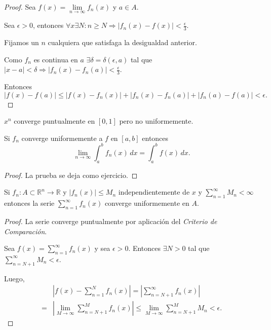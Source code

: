 \begin{proof}
Sea $f(x)=\lim\limits_{n \to \infty} f_n(x)$ y $a \in A$. 

Sea $\epsilon>0$, entonces $\forall x \exists N: n\geq N\Rightarrow|f_n(x)-f(x)|<\frac{\epsilon}{3} $. 

Fijamos un $n$ cualquiera que satisfaga la desigualdad anterior.

Como $f_n$ es continua en $a$ $\exists \delta=\delta(\epsilon,a)$ tal que 
$|x-a|<\delta \Rightarrow |f_n(x)-f_n(a)|<\frac{\epsilon}{3}$. 

Entonces 
\[
|f(x)-f(a)|\leq |f(x)-f_n(x)|+|f_n(x)-f_n(a)|+|f_n(a)-f(a)|<\epsilon.
\]
\end{proof}

\begin{ejemplo}{}
$x^n$ converge puntualmente en $[0,1]$ pero no uniformemente.
\end{ejemplo}

\begin{teorema}{}
Si $f_n$ converge uniformemente a $f$ en $[a,b]$ entonces
\[
\lim\limits_{n \to \infty} \int_a^b f_n(x)\,dx=\int_a^b f(x)\,dx.
\]
\end{teorema}

\begin{proof}
La prueba se deja como ejercicio.
\end{proof}

\begin{teorema}{}
Si $f_n:A\subset \mathbb{R}^n \to \mathbb{R}$ y $|f_n(x)|\leq M_n$ independientemente de $x$
y $\sum\limits_{n=1}^{\infty} M_n<\infty$ entonces la serie $\sum\limits_{n=1}^{\infty}f_n(x)$
converge uniformemente en $A$.
\end{teorema}

\begin{proof}
La serie converge puntualmente por aplicación del \textit{Criterio de Comparación}.

Sea $f(x)=\sum\limits_{n=1}^{\infty} f_n(x)$ y sea $\epsilon>0$.
Entonces $\exists N>0 $ tal que $\sum\limits_{n=N+1}^{\infty} M_n<\epsilon$. 

Luego, 
\[
\begin{split}
&\left|f(x)-\sum\limits_{n=1}^{N} f_n(x)\right|=\left|\sum\limits_{n=N+1}^{\infty} f_n(x)\right|
\\
=&\left|\lim\limits_{M\to \infty} \sum\limits_{n=N+1}^{M} f_n(x)\right|
\leq \lim\limits_{M\to \infty} \sum\limits_{n=N+1}^{M} M_n
<\epsilon.
\end{split}\]
\end{proof}


